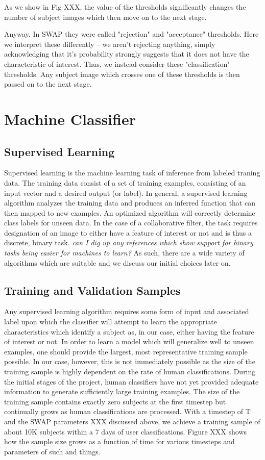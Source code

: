 \documentclass[twocolumn]{aastex6}
\begin{document}
As we show in Fig XXX, the value of the thresholds significantly changes the number of subject images which then move on to the next stage. 

Anyway. In SWAP they were called "rejection" and "acceptance" thresholds. Here we interpret these differently  -- we aren't rejecting anything, simply acknowledging that it's probability strongly suggests that it does not have the characteristic of interest. Thus, we instead consider these "classification" thresholds. Any subject image which crosses one of these thresholds is then passed on to the next stage. 




\section{Machine Classifier} \label{sec:machine}
\subsection{Supervised Learning}
Supervised learning is the machine learning task of inference from labeled traning data. The training data consist of a set of training examples, consisting of an input vector and a desired output (or label).  In general, a supervised learning algorithm analyzes the training data and produces an inferred function that can then mapped to new examples. An optimized algorithm will correctly determine class labels for unseen data. In the case of a collaborative filter, the task requires designation of an image to either have a feature of interest or not and is thus a discrete, binary task.  \textit{can I dig up any references which show support for binary tasks being easier for machines to learn?} As such, there are a wide variety of algorithms which are suitable and we discuss our initial choices later on. 

\subsection{Training and Validation Samples}

Any supervised learning algorithm requires some form of input and associated label upon which the classifier will attempt to learn the appropriate characteristics which identify a subject as, in our case, either having the feature of interest or not.  In order to learn a model which will generalize well to unseen examples, one should provide the largest, most representative training sample possible. In our case, however, this is not immediately possible as the size of the training sample is highly dependent on the rate of human classifications. During the initial stages of the project, human classifiers have not yet provided adequate information to generate sufficiently large training examples.  The size of the training sample contains exactly zero subjects at the first timestep but continually grows as human classifications are processed. With a timestep of T and the SWAP parameters XXX discussed above, we achieve a training sample of about 10K subjects within a 7 days of user classifications. Figure XXX shows how the sample size grows as a function of time for various timesteps and parameters of such and things. 
\end{document}
